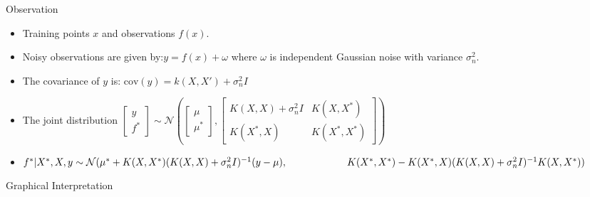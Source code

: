 




\begin{frame}{Observation}
    \begin{itemize}
    \item Training points \( x \) and observations \( f(x) \).
    
    \item Noisy observations are given by:\(y = f(x) + \omega\) where \( \omega \) is independent Gaussian noise with variance \( \sigma_n^2 \).
    
    \item The covariance of \( y \) is: \(\text{cov}(y) = k(X, X') + \sigma_n^2 I\)
    
    \item The joint distribution  \(\begin{bmatrix}y \\f^*\end{bmatrix}\sim \mathcal{N} \left(\begin{bmatrix}\mu \\ \mu^* \end{bmatrix},\begin{bmatrix}
    K(X, X) + \sigma_n^2 I & K(X, X^*) \\ K(X^*, X) & K(X^*, X^*) \end{bmatrix} \right)
    \)
    
    \item \( f^* | X^*, X, y\sim \mathcal{N} (\mu^* + K(X, X^*) ( K(X, X) + \sigma_n^2 I)^{-1} (y - \mu), \\ \qquad \quad \qquad \quad K(X^*, X^*) - K(X^*, X) ( K(X, X) + \sigma_n^2 I )^{-1} K(X, X^*) )
    \)

\end{itemize}
\end{frame}

\begin{frame}{Graphical Interpretation}

    \begin{figure}[!tbp]
        \centering
        \label{fig:f1}
    \end{figure}
\end{frame}


